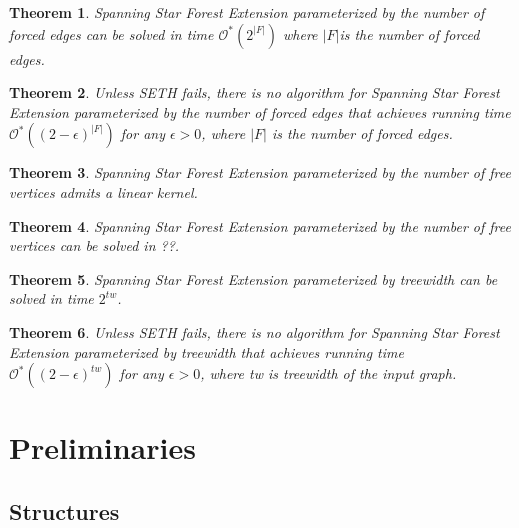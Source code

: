 \documentclass[en]{pracamgr}
\newtheorem{theorem}{Theorem}
\newcommand{\ssfep}{{\sc Spanning Star Forest Extension}}
\begin{document}
\begin{theorem}
	\ssfep{} parameterized by the number of forced edges can be solved in time $\mathcal{O}^*(2^{|F|})$ where $|F|$is the number of forced edges.
\end{theorem}

\begin{theorem}
	Unless SETH fails, there is no algorithm for \ssfep{} parameterized by the number of forced edges that achieves running time $\mathcal{O}^*((2-\epsilon)^{|F|})$ for any $\epsilon > 0$, where $|F|$ is the number of forced edges.
\end{theorem}

\begin{theorem}
	\ssfep{} parameterized by the number of free vertices admits a linear kernel.
\end{theorem}

\begin{theorem}
	\ssfep{} parameterized by the number of free vertices can be solved in ??.%
\end{theorem}

\begin{theorem}
	\ssfep{} parameterized by treewidth can be solved in time $2^{tw}$.
\end{theorem}

\begin{theorem}
	Unless SETH fails, there is no algorithm for \ssfep{} parameterized by treewidth that achieves running time $\mathcal{O}^*((2-\epsilon)^{tw})$ for any $\epsilon > 0$, where \textup{\textrm{tw}} is treewidth of the input graph.
\end{theorem}

\chapter{Preliminaries}

\section{Structures}
\end{document}
